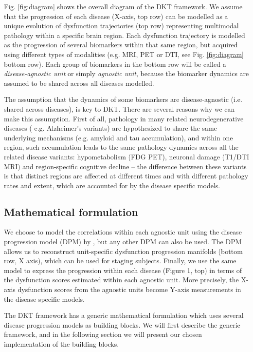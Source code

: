 \documentclass{llncs}
\begin{document}
Fig. \ref{fig:diagram} shows the overall diagram of the DKT framework. We assume that the progression of each disease (X-axis, top row) can be modelled as a unique evolution of dysfunction trajectories (top row) representing multimodal pathology within a specific brain region. Each dysfunction trajectory is modelled as the progression of several biomarkers within that same region, but acquired using different types of modalities (e.g. MRI, PET or DTI, see Fig. \ref{fig:diagram} bottom row). Each group of biomarkers in the bottom row will be called a \emph{disease-agnostic unit} or simply \emph{agnostic unit}, because the biomarker dynamics are assumed to be shared across all diseases modelled.

The assumption that the dynamics of some biomarkers are disease-agnostic (i.e. shared across diseases), is key to DKT. There are several reasons why we can make this assumption. First of all, pathology in many related neurodegenerative diseases ( e.g. Alzheimer's variants) are hypothesized to share the same underlying mechanisms (e.g. amyloid and tau accumulation), and within one region, such accumulation leads to the same pathology dynamics across all the related disease variants: hypometabolism (FDG PET), neuronal damage (T1/DTI MRI) and region-specific cognitive decline -- the difference between these variants is that distinct regions are affected at different times and with different pathology rates and extent, which are accounted for by the disease specific models.

\subsection{Mathematical formulation}

We choose to model the correlations within each agnostic unit using the disease progression model (DPM) by \cite{jedynak2012computational}, but any other DPM can also be used. The DPM allows us to reconstruct unit-specific dysfunction progression manifolds (bottom row, X axis), which can be used for staging subjects. Finally, we use the same model to express the progression within each disease (Figure 1, top) in terms of the dysfunction scores estimated within each agnostic unit. More precisely, the X-axis dysfunction scores from the agnostic units become Y-axis measurements in the disease specific models.

The DKT framework has a generic mathematical formulation which uses several disease progression models as building blocks. We will first describe the generic framework, and in the following section we will present our chosen implementation of the building blocks. 
\end{document}
